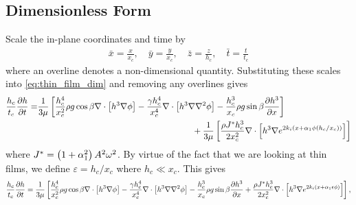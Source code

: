 \subsection{Dimensionless Form}
Scale the in-plane coordinates and time by 
\begin{gather*}
    \bar{x} = \frac{x}{x_c}, \quad \bar{y} = \frac{y}{x_c}, \quad \bar{z} = \frac{z}{h_c}, \quad \bar{t} = \frac{t}{t_c}
\end{gather*}
where an overline denotes a non-dimensional quantity. Substituting these scales 
into \cref{eq:thin_film_dim} and removing any overlines gives 
\begin{align}
    \begin{split}
        \frac{h_c}{t_c} \frac{\partial h}{\partial t} = &\frac{1}{3\mu} \left[ 
            \frac{h_c^4}{x_c^2} \rho g \cos \beta \nabla \cdot \left[ h^3\nabla\phi \right] - 
            \frac{\gamma h_c^4}{x_c^4} \nabla \cdot \left[ h^3 \nabla \nabla^2 \phi \right] - 
            \frac{h_c^3}{x_c} \rho g \sin\beta \frac{\partial h^3}{\partial x}
         \right]\\
        &\qquad \qquad \qquad \qquad \qquad \qquad \qquad \qquad \qquad + \frac{1}{3\mu} \left[  
            \frac{\rho J^* h_c^3}{2 x_c^2} \nabla \cdot \left[ h^3 \nabla e^{2k_i \left( x + \alpha_1 \phi \left( h_c/x_c \right) \right)} \right]
         \right]
    \end{split}
    \label{eq:nondim_first}
\end{align}
where $J^* = \left( 1+\alpha_1^2 \right)A^2\omega^2$. 
By virtue of the fact that we are looking at thin films, we define $\varepsilon = h_c / x_c$ where $h_c \ll x_c$. 
This gives
\begin{gather*}
    \nonumber \frac{h_c}{t_c} \frac{\partial h}{\partial t} = \frac{1}{3\mu} \left[ 
        \frac{h_c^4}{x_c^2} \rho g \cos \beta \nabla \cdot \left[ h^3\nabla\phi \right] - 
        \frac{\gamma h_c^4}{x_c^4} \nabla \cdot \left[ h^3 \nabla \nabla^2 \phi \right] - 
        \frac{h_c^3}{x_c} \rho g \sin\beta \frac{\partial h^3}{\partial x} + 
        \frac{\rho J^* h_c^3}{2 x_c^2} \nabla \cdot \left[ h^3 \nabla e^{2k_i \left( x + \alpha_1 \epsilon \phi \right)} \right]
     \right],
\end{gather*}
